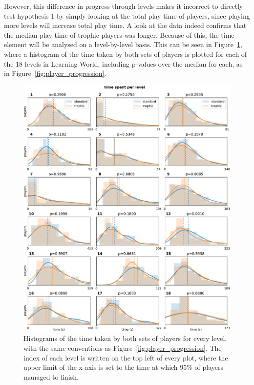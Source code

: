 However, this difference in progress through levels makes it incorrect to directly test hypothesis 1 by simply looking at the total play time of players, since playing more levels will increase total play time. A look at the data indeed confirms that the median play time of trophic players was longer.
Because of this, the time element will be analysed on a level-by-level basis. This can be seen in Figure~\ref{fig:level_times}, where a histogram of the time taken by both sets of players is plotted for each of the 18 levels in Learning World, including p-values over the median for each, as in Figure~\ref{fig:player_progression}.

\begin{figure}
    \centering
    \includegraphics[width=\textwidth]{joy/times.pdf}
    \caption[Histograms showing the time spent on each level]{Histograms of the time taken by both sets of players for every level, with the same conventions as Figure~\ref{fig:player_progression}. The index of each level is written on the top left of every plot, where the upper limit of the x-axis is set to the time at which 95\% of players managed to finish.}
    \label{fig:level_times}
\end{figure}

